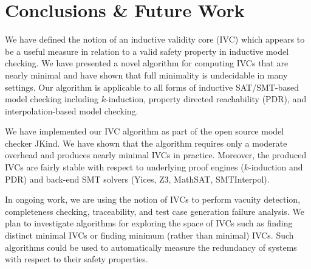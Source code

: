 \section{Conclusions \& Future Work}
\label{sec:conc}

We have defined the notion of an inductive validity core (IVC) which
appears to be a useful measure in relation to a valid safety property
in inductive model checking. We have presented a novel algorithm for
computing IVCs that are nearly minimal and have shown that full
minimality is undecidable in many settings. Our algorithm is
applicable to all forms of inductive SAT/SMT-based model checking
including $k$-induction, property directed reachability (PDR), and
interpolation-based model checking.

We have implemented our IVC algorithm as part of the open source model
checker JKind. We have shown that the algorithm requires only a
moderate overhead and produces nearly minimal IVCs in practice.
Moreover, the produced IVCs are fairly stable with respect to
underlying proof engines ($k$-induction and PDR) and back-end SMT
solvers (Yices, Z3, MathSAT, SMTInterpol).

In ongoing work, we are using the notion of IVCs to perform vacuity
detection, completeness checking, traceability, and test case
generation failure analysis. We plan to investigate algorithms for
exploring the space of IVCs such as finding distinct minimal IVCs or
finding minimum (rather than minimal) IVCs. Such algorithms could be
used to automatically measure the redundancy of systems with respect
to their safety properties.


